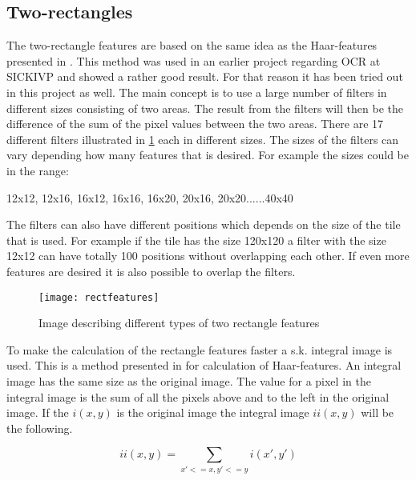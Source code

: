 \subsection{Two-rectangles}
\label{sec:Two-rectangles}
The two-rectangle features are based on the same idea as the Haar-features presented in \citep{Viola:2010}. This method was used in an earlier project regarding OCR at SICKIVP and showed a rather good result. For that reason it has been tried out in this project as well. The main concept is to use a large number of filters in different sizes consisting of two areas. The result from the filters will then be the difference of the sum of the pixel values between the two areas. There are 17 different filters illustrated in \ref{Two-rectangle} each in different sizes. The sizes of the filters can vary depending how many features that is desired. For example the sizes could be in the range:
\begin{center}
	12x12, 12x16, 16x12, 16x16, 16x20, 20x16, 20x20......40x40
\end{center}
The filters can also have different positions which depends on the size of the tile that is used. For example if the tile has the size 120x120 a filter with the size 12x12 can have totally 100 positions without overlapping each other. If even more features are desired it is also possible to overlap the filters.  
\begin{figure}[H]
\centering
	\texttt{[image: rectfeatures]}
	\caption{Image describing different types of two rectangle features}
	\label{Two-rectangle}
\end{figure}

To make the calculation of the rectangle features faster a s.k. integral image is used. This is a method presented in \citep{Viola:2010} for calculation of Haar-features. An integral image has the same size as the original image. The value for a pixel in the integral image is the sum of all the pixels above and to the left in the original image. If the $i(x,y)$ is the original image the integral image $ii(x,y)$ will be the following.

\begin{equation}
	ii(x,y) = \sum_{x' <= x, y' <= y} i(x',y')
\end{equation}

